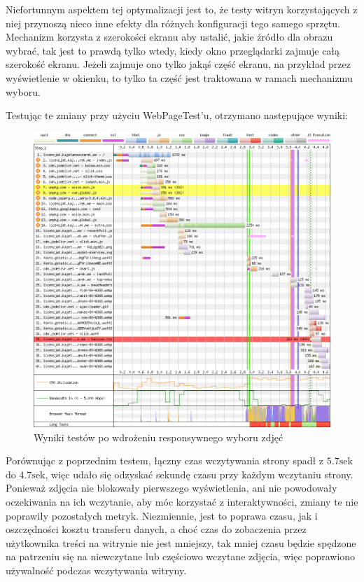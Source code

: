\documentclass[licencjacka]{pracadypl}
\begin{document}
Niefortunnym aspektem tej optymalizacji jest to, że testy witryn korzystających z niej przynoszą nieco inne efekty dla różnych konfiguracji tego samego sprzętu. Mechanizm korzysta z szerokości ekranu aby ustalić, jakie źródło dla obrazu wybrać, tak jest to prawdą tylko wtedy, kiedy okno przeglądarki zajmuje całą szerokość ekranu. Jeżeli zajmuje ono tylko jakąś część ekranu, na przykład przez wyświetlenie w okienku, to tylko ta część jest traktowana w ramach mechanizmu wyboru.

Testując te zmiany przy użyciu WebPageTest'u, otrzymano następujące wyniki:

\begin{figure}[H]
  \includegraphics[width=\linewidth]{images/waterfall-after-sizing.png}
  \caption{Wyniki testów po wdrożeniu responsywnego wyboru zdjęć}
  \label{fig:waterfall-after-sizing}
\end{figure}

Porównując z poprzednim testem, łączny czas wczytywania strony spadł z $5.7\text{sek}$ do $4.7\text{sek}$, więc udało się odzyskać sekundę czasu przy każdym wczytaniu strony. Ponieważ zdjęcia nie blokowały pierwszego wyświetlenia, ani nie powodowały oczekiwania na ich wczytanie, aby móc korzystać z interaktywności, zmiany te nie poprawiły pozostałych metryk. Niezmiennie, jest to poprawa czasu, jak i oszczędności kosztu transferu danych, a choć czas do zobaczenia przez użytkownika treści na witrynie nie jest mniejszy, tak mniej czasu będzie spędzone na patrzeniu się na niewczytane lub częściowo wczytane zdjęcia, więc poprawiono używalność podczas wczytywania witryny.
\end{document}
